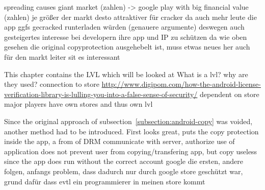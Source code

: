 spreading causes giant market (zahlen) -> google play with big financial value (zahlen)\newline
je größer der markt desto attraktiver für cracker da auch mehr leute die app ggfs gecracked runterladen würden (genauere argumente)\newline
deswegen auch gesteigertes interesse bei developern ihre app und IP zu schützen\newline
da wie oben gesehen die original copyprotection ausgehebelt ist, muss etwas neues her\newlien
auch für den markt leiter sit es interessant


This chapter contains the LVL which will be looked at\newline
What is a lvl? why are they used? connection to store\newline
\url{http://www.digipom.com/how-the-android-license-verification-library-is-lulling-you-into-a-false-sense-of-security/}\newline
dependent on store\newline
major players have own stores and thus own lvl\newline


Since the original approach of subsection~\ref{subsection:android-copy} was voided, another method had to be introduced.
First looks great, puts the copy protection inside the app, a from of DRM\newline
communicate with server, authorize use of application\newline
does not prevent user from copying/transfering app, but copy useless since the app does run without the correct account\newline
google die ersten, andere folgen, anfangs problem, dass dadurch nur durch google store geschützt war, grund dafür dass evtl ein programmierer in meinen store kommt\newline
